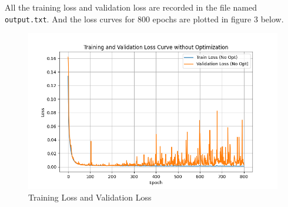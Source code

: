 \documentclass{article}
\begin{document}
All the training loss and validation loss are recorded in the file named \texttt{output.txt}.
And the loss curves for 800 epochs are plotted in figure 3 below.
\begin{figure}[ht]
  \centering
  \includegraphics[width=\linewidth]{../assets/Training Loss and Validation Loss No opt.png}
  \caption{Training Loss and Validation Loss}
\end{figure}
\end{document}
